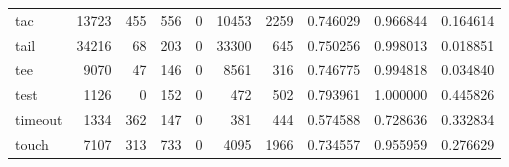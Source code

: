 \begin{tabular}{lrrrrrrrrr}
tac       &                               13723 &                                             455 &                                            556 &                                             0 &                                          10453 &                                         2259 &                                           0.746029 &                               0.966844 &                             0.164614 \\
tail      &                               34216 &                                              68 &                                            203 &                                             0 &                                          33300 &                                          645 &                                           0.750256 &                               0.998013 &                             0.018851 \\
tee       &                                9070 &                                              47 &                                            146 &                                             0 &                                           8561 &                                          316 &                                           0.746775 &                               0.994818 &                             0.034840 \\
test      &                                1126 &                                               0 &                                            152 &                                             0 &                                            472 &                                          502 &                                           0.793961 &                               1.000000 &                             0.445826 \\
timeout   &                                1334 &                                             362 &                                            147 &                                             0 &                                            381 &                                          444 &                                           0.574588 &                               0.728636 &                             0.332834 \\
touch     &                                7107 &                                             313 &                                            733 &                                             0 &                                           4095 &                                         1966 &                                           0.734557 &                               0.955959 &                             0.276629 \\

\end{tabular}
